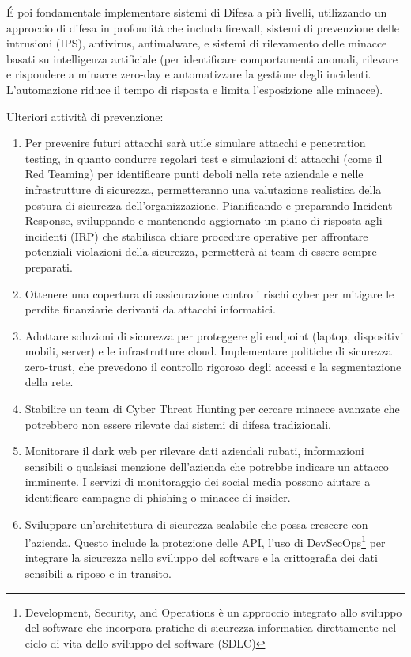 \'E poi fondamentale implementare sistemi di Difesa a più livelli, utilizzando un approccio di difesa in profondità che includa firewall, sistemi di prevenzione delle intrusioni (IPS), antivirus, antimalware, e sistemi di rilevamento delle minacce basati su intelligenza artificiale (per identificare comportamenti anomali, rilevare e rispondere a minacce zero-day e automatizzare la gestione degli incidenti. L'automazione riduce il tempo di risposta e limita l'esposizione alle minacce).

Ulteriori attività di prevenzione:

\begin{enumerate}
    \item Per prevenire futuri attacchi sarà utile simulare attacchi e penetration testing, in quanto condurre regolari test e simulazioni di attacchi (come il Red Teaming) per identificare punti deboli nella rete aziendale e nelle infrastrutture di sicurezza, permetteranno una valutazione realistica della postura di sicurezza dell'organizzazione. Pianificando e preparando Incident Response, sviluppando e mantenendo aggiornato un piano di risposta agli incidenti (IRP) che stabilisca chiare procedure operative per affrontare potenziali violazioni della sicurezza, permetterà ai team di essere sempre preparati.
    \item Ottenere una copertura di assicurazione contro i rischi cyber per mitigare le perdite finanziarie derivanti da attacchi informatici.
    \item Adottare soluzioni di sicurezza per proteggere gli endpoint (laptop, dispositivi mobili, server) e le infrastrutture cloud. Implementare politiche di sicurezza zero-trust, che prevedono il controllo rigoroso degli accessi e la segmentazione della rete.
    \item Stabilire un team di Cyber Threat Hunting per cercare minacce avanzate che potrebbero non essere rilevate dai sistemi di difesa tradizionali.
    \item Monitorare il dark web per rilevare dati aziendali rubati, informazioni sensibili o qualsiasi menzione dell'azienda che potrebbe indicare un attacco imminente. I servizi di monitoraggio dei social media possono aiutare a identificare campagne di phishing o minacce di insider.
    \item Sviluppare un'architettura di sicurezza scalabile che possa crescere con l'azienda. Questo include la protezione delle API, l'uso di DevSecOps\footnote{Development, Security, and Operations è un approccio integrato allo sviluppo del software che incorpora pratiche di sicurezza informatica direttamente nel ciclo di vita dello sviluppo del software (SDLC)} per integrare la sicurezza nello sviluppo del software e la crittografia dei dati sensibili a riposo e in transito.
\end{enumerate}


